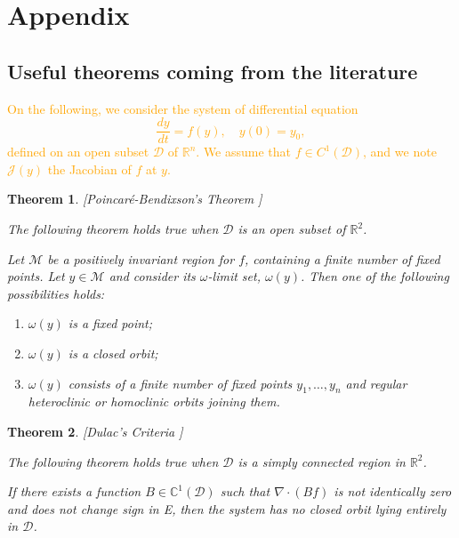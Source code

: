 \documentclass{article}
\newcommand{\vdeux}[1]{\textcolor{orange}{#1}}
\newtheorem{theorem}{Theorem}
\theoremstyle{definition}
\theoremstyle{remark}
\begin{document}
\section*{Appendix}
\begin{appendix}
\section{Useful theorems coming from the literature} \label{sec:litterature theorems}
\vdeux{
On the following, we consider the system of differential equation
\begin{equation}
\dfrac{dy}{dt} = f(y), \quad y(0) = y_0,
\label{equation:generic system}
\end{equation}
defined on an open subset $\mathcal{D}$ of $\mathbb{R}^n$. We assume that $f \in C^1(\mathcal{D})$, and we note $\mathcal{J}(y)$ the Jacobian of $f$ at $y$.}

\begin{theorem}  \label{theorem:Poincaré-Bendixson} [Poincaré-Bendixson's Theorem  \cite{wiggins_introduction_2003}]

The following theorem holds true when $\mathcal{D}$ is an open subset of $\mathbb R ^2$.

Let $\mathcal{M}$ be a positively invariant region for $f$, containing a finite number of fixed points. Let $y \in \mathcal{M}$ and consider its $\omega$-limit set, $\omega(y)$. Then one of the following possibilities holds:
\begin{enumerate}
\item $\omega(y)$ is a fixed point;
\item $\omega(y)$ is a closed orbit;
\item $\omega(y)$ consists of a finite number of fixed points $y_1, \ldots, y_n$ and regular heteroclinic or homoclinic orbits joining them.
\end{enumerate}
\end{theorem}

\begin{theorem} \label{theorem:Dulac} [Dulac's Criteria \cite{perko_differential_1996}]

The following theorem holds true when $\mathcal{D}$ is a simply connected region in $\mathbb R ^2$. 

If there exists a function $B \in \mathbb{C}^1(\mathcal{D})$ such that $\nabla \cdot (Bf)$ is not identically zero and does not change sign in E, then the system has no closed orbit lying entirely in $\mathcal{D}$.
\end{theorem}


\end{appendix}
\end{document}
